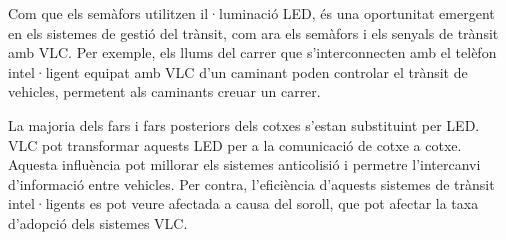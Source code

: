 Com que els semàfors utilitzen il·luminació LED, és una oportunitat emergent en els sistemes de gestió del trànsit, com ara els semàfors i els senyals de trànsit amb VLC. Per exemple, els llums del carrer que s'interconnecten amb el telèfon intel·ligent equipat amb VLC d'un caminant poden controlar el trànsit de vehicles, permetent als caminants creuar un carrer.

La majoria dels fars i fars posteriors dels cotxes s'estan substituint per LED. VLC pot transformar aquests LED per a la comunicació de cotxe a cotxe. Aquesta influència pot millorar els sistemes anticolisió i permetre l'intercanvi d'informació entre vehicles. Per contra, l'eficiència d'aquests sistemes de trànsit intel·ligents es pot veure afectada a causa del soroll, que pot afectar la taxa d'adopció dels sistemes VLC.


